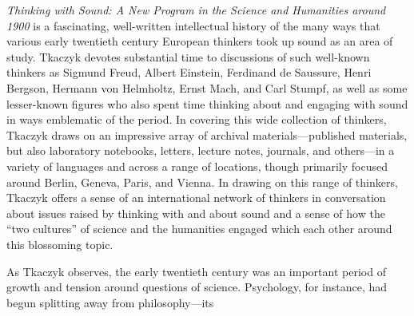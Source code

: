 \documentclass{tufte-handout}
\begin{document}
\begin{titlepage}
\vspace{0.2in}

 \emph{Thinking with Sound: A New Program in the
Science and Humanities around 1900} is a fascinating, well-written
intellectual history of the many ways that various early twentieth
century European thinkers took up sound as an area of study. Tkaczyk
devotes substantial time to discussions of such well-known thinkers as
Sigmund Freud, Albert Einstein, Ferdinand de Saussure, Henri Bergson,
Hermann von Helmholtz, Ernst Mach, and Carl Stumpf, as well as some
lesser-known figures who also spent time thinking about and engaging
with sound in ways emblematic of the period. In covering this wide
collection of thinkers, Tkaczyk draws on an impressive array of archival
materials---published materials, but also laboratory notebooks, letters,
lecture notes, journals, and others---in a variety of languages and
across a range of locations, though primarily focused around Berlin,
Geneva, Paris, and Vienna. In drawing on this range of thinkers, Tkaczyk
offers a sense of an international network of thinkers in conversation
about issues raised by thinking with and about sound and a sense of how
the ``two cultures'' of science and the humanities engaged which each
other around this blossoming topic.

As Tkaczyk observes, the early twentieth century was an important period
of growth and tension around questions of science. Psychology, for
instance, had begun splitting away from philosophy---its 

\enlargethispage{2\baselineskip}

\vspace*{3em}



 \end{titlepage}

\end{document}

